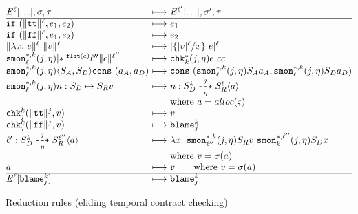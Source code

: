 \documentclass[preprint,onecolumn,9pt]{sigplanconf} %
\begin{document}
\begin{figure*}
  \centering
    $\begin{array}{@{}l @{\ }c@{\ } l@{}}
      \mctx{\mmlab}[\ldots], \msto, \mTMons &\machstep& \mctx{\mmlab^\prime}[\ldots], \msto^\prime, \mTMons
      \\ \hline
      \sif{ \sOwn{\strue}{\mmlab} }{\mexp_1}{\mexp_2}
      &\machstep&
      \mexp_1
      \\
      \sif{ \sOwn{\sfalse}{\mmlab} }{\mexp_1}{\mexp_2}
      &\machstep&
      \mexp_2
      \\
      \sapp{ \sOwn{\slam{\mvar}{\mexp}}{\mmlab} }{ \sOwn{\mval}{\mmlab} }
      &\machstep&
      \sown{ \sapp{\{ \sown{\mval}{\mmlab}/\mvar \}}{\mexp} }{\mmlab}
      \\
      \sSMon*{k}{\mmlab}{j}{\mtimeline}{ \sown*{\sflat{\mexp}}{\mmlab^{\prime\prime}} }{ \sOwn{\mconstant}{\mmlab^{\prime\prime}} }
      &\machstep&
      \schk*{k}{j}{\mtimeline}{ \sapp{\mexp}{\mconstant} }{\mconstant}
      \\ %
      \sSMon*{k}{\mmlab}{j}{\mtimeline}{\sconsc{\mscon_A}{\mscon_D}}{ \vcons{\maddr_A}{\maddr_D} }
      &\machstep&
      \vcons{ \sSMon*{k}{\mmlab}{j}{\mtimeline}{\mscon_A}{\maddr_A} }{ \sSMon*{k}{\mmlab}{j}{\mtimeline}{\mscon_D}{\maddr_D} }
      \\
      \sSMon*{k}{\mmlab}{j}{\mtimeline}{ \sarr{\mname}{\mscon_D}{\mscon_R} }{\mval}
      &\machstep&
      \bclos{\mname}{\mscon_D}{k}{j}{\mtimeline}{\mscon_R}{\mmlab}{\maddr} \\
      &&\text{where } \maddr = alloc(\mstate)
      \\
      \schk{k}{j}{ \sOwn{\strue}{j} }{\mval}
      &\machstep&
      \mval
      \\
      \schk{k}{j}{ \sOwn{\sfalse}{j} }{\mval}
      &\machstep&
      \sblame{k}{j}
      \\
      \bclos{\mmlab^\prime}{\mscon_D}{k}{j}{\mtimeline}{\mscon_R}{\mmlab^{\prime\prime}}{\maddr}
      &\machstep&
      \slam{\mvar}{ \sSMon*{k}{\mmlab^{\prime\prime}}{j}{\mtimeline}{\mscon_R}{%
      \sapp{\mval}{ \sSMon*{\mmlab^{\prime\prime}}{k}{j}{\mtimeline}{\mscon_D}{\mvar} } } } \\
      &&\text{where } \mval = \msto(\maddr)
      \\
      \maddr &\machstep& \mval \qquad\text{where } \mval = \msto(\maddr)
      \\ \hline
      \mctx{\mmlab}[\sblame{k}{j}]
      &\machstep&
      \sblame{k}{j}
    \end{array}$
  \caption{Reduction rules (eliding temporal contract checking)}
  \label{fig:standard}
\end{figure*}

\balance

%


% 
\end{document}
